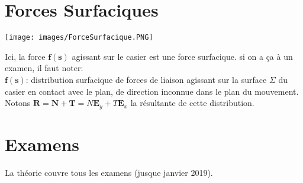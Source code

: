 \documentclass[a4paper]{article}
\begin{document}
\section{Forces Surfaciques}





\begin{center} \texttt{[image: images/ForceSurfacique.PNG]} \end{center}

Ici, la force $ \textbf{f}(\textbf{s}) $ agissant sur le casier est une force surfacique. si on a ça à un examen, il faut noter: \\
$ \textbf{f}(\textbf{s}) $: distribution surfacique de forces de liaison agissant sur la surface $ \Sigma $ du casier en contact avec le plan, de direction inconnue dans le plan du mouvement. Notons $ \textbf{R} = \textbf{N} + \textbf{T} = N \textbf{E}_y + T \textbf{E}_x $ la résultante de cette distribution.










\newpage










\section{Examens}





La théorie couvre tous les examens (jusque janvier 2019).
\end{document}

